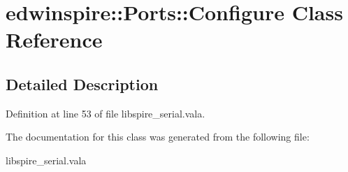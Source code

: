 \hypertarget{classedwinspire_1_1_ports_1_1_configure}{\section{edwinspire\-:\-:Ports\-:\-:Configure Class Reference}
\label{classedwinspire_1_1_ports_1_1_configure}
}


\subsection{Detailed Description}


Definition at line 53 of file libspire\-\_\-serial.\-vala.



The documentation for this class was generated from the following file\-:\begin{DoxyCompactItemize}
\item 
libspire\-\_\-serial.\-vala\end{DoxyCompactItemize}
